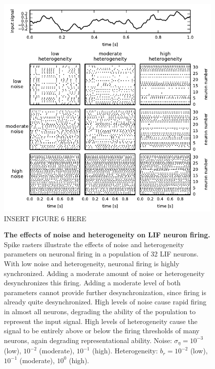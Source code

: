 \documentclass[12pt]{article}
\begin{document}
\begin{figure}
  \ifx\hidefigures\undefined
    \centering
    \includegraphics[width=\textwidth]{figure6_syncraster.pdf}
  \else
    INSERT FIGURE 6 HERE
  \fi
  \caption{
    \textbf{The effects of noise and heterogeneity on LIF neuron firing.}
    Spike rasters illustrate the effects of noise and heterogeneity parameters on neuronal firing in a population of 32 LIF neurons. With low noise and heterogeneity, neuronal firing is highly synchronized. Adding a moderate amount of noise or heterogeneity desynchronizes this firing. Adding a moderate level of both parameters cannot provide further desynchronization, since firing is already quite desynchronized. High levels of noise cause rapid firing in almost all neurons, degrading the ability of the population to represent the input signal. High levels of heterogeneity cause the signal to be entirely above or below the firing thresholds of many neurons, again degrading representational ability. Noise: $\sigma_\eta = $$10^{-3}$ (low), $10^{-2}$ (moderate), $10^{-1}$ (high). Heterogeneity: $b_r = $$10^{-2}$ (low), $10^{-1}$ (moderate), $10^{0}$ (high).
  }
  \label{fig:syncraster}
\end{figure}
\end{document}
